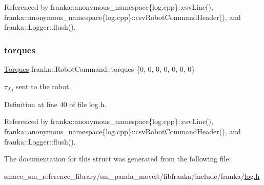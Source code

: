 Referenced by franka\+::anonymous\+\_\+namespace\{log.\+cpp\}\+::csv\+Line(), franka\+::anonymous\+\_\+namespace\{log.\+cpp\}\+::csv\+Robot\+Command\+Header(), and franka\+::\+Logger\+::flush().

\mbox{\label{structfranka_1_1RobotCommand_a8b23e8b669b1fd594988ecdbf54bfbce}} 
\subsubsection{\texorpdfstring{torques}{torques}}
{\footnotesize\ttfamily \hyperlink{classfranka_1_1Torques}{Torques} franka\+::\+Robot\+Command\+::torques \{0, 0, 0, 0, 0, 0, 0\}}

${\tau_J}_d$ sent to the robot. 

Definition at line 40 of file log.\+h.



Referenced by franka\+::anonymous\+\_\+namespace\{log.\+cpp\}\+::csv\+Line(), franka\+::anonymous\+\_\+namespace\{log.\+cpp\}\+::csv\+Robot\+Command\+Header(), and franka\+::\+Logger\+::flush().



The documentation for this struct was generated from the following file\+:\begin{DoxyCompactItemize}
\item 
smacc\+\_\+sm\+\_\+reference\+\_\+library/sm\+\_\+panda\+\_\+moveit/libfranka/include/franka/\hyperlink{log_8h}{log.\+h}\end{DoxyCompactItemize}
